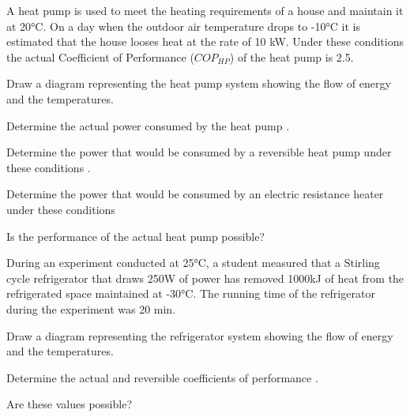 \begin{homework}
  \question A heat pump is used to meet the heating requirements of a house and maintain it at 20°C. On a day when the outdoor air temperature drops to -10°C it is estimated that the house looses heat at the rate of 10 kW. Under these conditions the actual Coefficient of Performance ($COP_{HP}$) of the heat pump is 2.5.
  \begin{questionparts}
  \item Draw a diagram representing the heat pump system showing the flow of energy and the temperatures.
  \item Determine the actual power consumed by the heat pump \answer{[4 kW]}.
  \item Determine the power that would be consumed by a reversible heat pump under these conditions \answer{[1.02 kW]}.
  \item Determine the power that would be consumed by an electric resistance heater under these conditions \answer{[10 kW]}
  \item Is the performance of the actual heat pump possible?
  \end{questionparts}
  \question During an experiment conducted at 25°C, a student measured that a Stirling cycle refrigerator that draws 250W of power has removed 1000kJ of heat from the refrigerated space maintained at -30°C. The running time of the refrigerator during the experiment was 20 min.
  \begin{questionparts}
  \item Draw a diagram representing the refrigerator system showing the flow of energy and the temperatures.
  \item Determine the actual and reversible coefficients of performance \answer{[$\rm COP_R$ = 3.33, $\rm COP_{R,rev}$ = 4.42]}.
  \item Are these values possible?
  \end{questionparts}
\end{homework}
